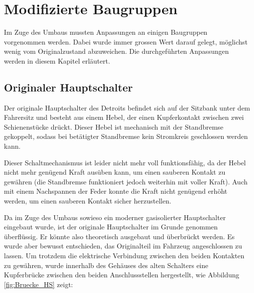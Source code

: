 \section{Modifizierte Baugruppen}

\color{blue}
Im Zuge des Umbaus mussten Anpassungen an einigen Baugruppen vorgenommen werden. Dabei wurde immer grossen Wert darauf gelegt, möglichst wenig vom Originalzustand abzuweichen. Die durchgeführten Anpassungen werden in diesem Kapitel erläutert.

\subsection{Originaler Hauptschalter}
Der originale Hauptschalter des Detroits befindet sich auf der Sitzbank unter dem Fahrersitz und besteht aus einem Hebel, der einen Kupferkontakt zwischen zwei Schienenstücke drückt. Dieser Hebel ist mechanisch mit der Standbremse gekoppelt, sodass bei betätigter Standbremse kein Stromkreis geschlossen werden kann.

Dieser Schaltmechanismus ist leider nicht mehr voll funktionsfähig, da der Hebel nicht mehr genügend Kraft ausüben kann, um einen sauberen Kontakt zu gewähren (die Standbremse funktioniert jedoch weiterhin mit voller Kraft). Auch mit einem Nachspannen der Feder konnte die Kraft nicht genügend erhöht werden, um einen sauberen Kontakt sicher herzustellen.

Da im Zuge des Umbaus sowieso ein moderner gasisolierter Hauptschalter eingebaut wurde, ist der originale Hauptschalter im Grunde genommen überflüssig. Er könnte also theoretisch ausgebaut und überbrückt werden. Es wurde aber bewusst entschieden, das Originalteil im Fahrzeug angeschlossen zu lassen. Um trotzdem die elektrische Verbindung zwischen den beiden Kontakten zu gewähren, wurde innerhalb des Gehäuses des alten Schalters eine Kupferbrücke zwischen den beiden Anschlussstellen hergestellt, wie Abbildung \ref{fig:Bruecke_HS} zeigt:

